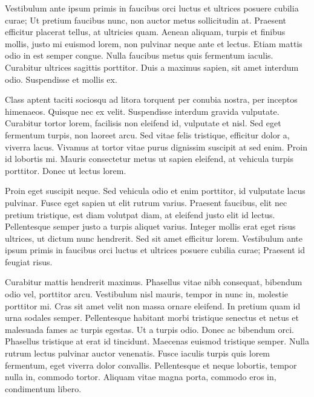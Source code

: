 \documentclass{article}
\begin{document}
Vestibulum ante ipsum primis in faucibus orci luctus et ultrices posuere cubilia curae; Ut pretium faucibus nunc, non auctor metus sollicitudin at. Praesent efficitur placerat tellus, at ultricies quam. Aenean aliquam, turpis et finibus mollis, justo mi euismod lorem, non pulvinar neque ante et lectus. Etiam mattis odio in est semper congue. Nulla faucibus metus quis fermentum iaculis. Curabitur ultrices sagittis porttitor. Duis a maximus sapien, sit amet interdum odio. Suspendisse et mollis ex.

Class aptent taciti sociosqu ad litora torquent per conubia nostra, per inceptos himenaeos. Quisque nec ex velit. Suspendisse interdum gravida vulputate. Curabitur tortor lorem, facilisis non eleifend id, vulputate et nisl. Sed eget fermentum turpis, non laoreet arcu. Sed vitae felis tristique, efficitur dolor a, viverra lacus. Vivamus at tortor vitae purus dignissim suscipit at sed enim. Proin id lobortis mi. Mauris consectetur metus ut sapien eleifend, at vehicula turpis porttitor. Donec ut lectus lorem.

Proin eget suscipit neque. Sed vehicula odio et enim porttitor, id vulputate lacus pulvinar. Fusce eget sapien ut elit rutrum varius. Praesent faucibus, elit nec pretium tristique, est diam volutpat diam, at eleifend justo elit id lectus. Pellentesque semper justo a turpis aliquet varius. Integer mollis erat eget risus ultrices, ut dictum nunc hendrerit. Sed sit amet efficitur lorem. Vestibulum ante ipsum primis in faucibus orci luctus et ultrices posuere cubilia curae; Praesent id feugiat risus.

Curabitur mattis hendrerit maximus. Phasellus vitae nibh consequat, bibendum odio vel, porttitor arcu. Vestibulum nisl mauris, tempor in nunc in, molestie porttitor mi. Cras sit amet velit non massa ornare eleifend. In pretium quam id urna sodales semper. Pellentesque habitant morbi tristique senectus et netus et malesuada fames ac turpis egestas. Ut a turpis odio. Donec ac bibendum orci. Phasellus tristique at erat id tincidunt. Maecenas euismod tristique semper. Nulla rutrum lectus pulvinar auctor venenatis. Fusce iaculis turpis quis lorem fermentum, eget viverra dolor convallis. Pellentesque et neque lobortis, tempor nulla in, commodo tortor. Aliquam vitae magna porta, commodo eros in, condimentum libero.
\end{document}
